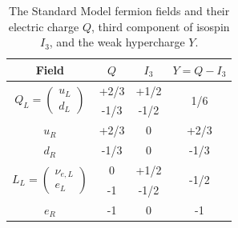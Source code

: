 \begin{table}[!htbp]
    \centering
    \begin{tabular}{cccc}
    \hline \hline
         Field & $Q$ & $I_3$ & $Y=Q-I_3$ \\
         \hline
         \multirow{2}{*}{$Q_L = \left(\begin{array}{c} u_L \\ d_L \end{array}\right)$} & +2/3 & +1/2 & \multirow{2}{*}{1/6} \\
         & -1/3 & -1/2 & \\
         $u_R$ & +2/3 & 0 & +2/3 \\
         $d_R$ & -1/3 & 0 & -1/3 \\
         \hline
         \multirow{2}{*}{$L_L = \left(\begin{array}{c} \nu_{e,L} \\ e_L \end{array}\right)$} & 0 & +1/2 & \multirow{2}{*}{-1/2} \\
         & -1 & -1/2 & \\
         $e_R$ & -1 & 0 & -1 \\
         \hline\hline
    \end{tabular}
    \caption{The Standard Model fermion fields and their electric charge $Q$, third component of isospin $I_3$, and the weak hypercharge $Y$.}
    \label{tab:fermion_charges}
\end{table}

